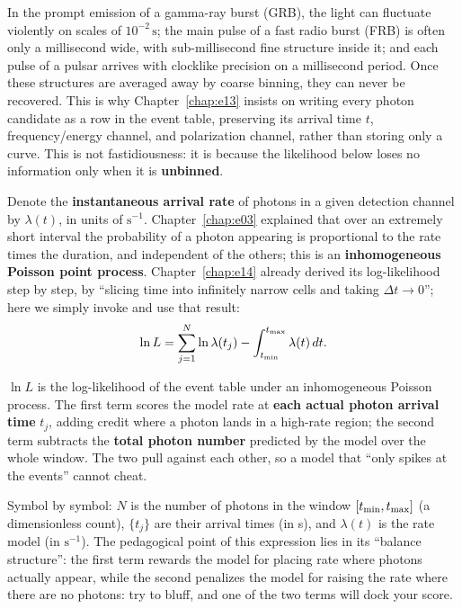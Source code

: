 In the prompt emission of a gamma-ray burst (GRB), the light can fluctuate violently on scales of \(10^{-2}\,\mathrm{s}\); the main pulse of a fast radio burst (FRB) is often only a millisecond wide, with sub-millisecond fine structure inside it; and each pulse of a pulsar arrives with clocklike precision on a millisecond period. Once these structures are averaged away by coarse binning, they can never be recovered. This is why Chapter~\ref{chap:e13} insists on writing every photon candidate as a row in the event table, preserving its arrival time \(t\), frequency/energy channel, and polarization channel, rather than storing only a curve. This is not fastidiousness: it is because the likelihood below loses no information only when it is \textbf{unbinned}.

Denote the \textbf{instantaneous arrival rate} of photons in a given detection channel by \(\lambda(t)\), in units of \(\mathrm{s^{-1}}\). Chapter~\ref{chap:e03} explained that over an extremely short interval the probability of a photon appearing is proportional to the rate times the duration, and independent of the others; this is an \textbf{inhomogeneous Poisson point process}. Chapter~\ref{chap:e14} already derived its log-likelihood step by step, by ``slicing time into infinitely narrow cells and taking \(\Delta t\to0\)''; here we simply invoke and use that result:
\begin{equation}
  \ln L=\sum_{j=1}^{N}\ln \lambda(t_j)-\int_{t_{\rm min}}^{t_{\rm max}}\lambda(t)\,dt .
  \label{eq:e20-poisson-likelihood}
\end{equation}
\begin{formulaexplain}
\(\ln L\) is the log-likelihood of the event table under an inhomogeneous Poisson process. The first term scores the model rate at \textbf{each actual photon arrival time} \(t_j\), adding credit where a photon lands in a high-rate region; the second term subtracts the \textbf{total photon number} predicted by the model over the whole window. The two pull against each other, so a model that ``only spikes at the events'' cannot cheat.
\end{formulaexplain}
Symbol by symbol: \(N\) is the number of photons in the window \([t_{\rm min},t_{\rm max}]\) (a dimensionless count), \(\{t_j\}\) are their arrival times (in s), and \(\lambda(t)\) is the rate model (in \(\mathrm{s^{-1}}\)). The pedagogical point of this expression lies in its ``balance structure'': the first term rewards the model for placing rate where photons actually appear, while the second penalizes the model for raising the rate where there are no photons: try to bluff, and one of the two terms will dock your score.

